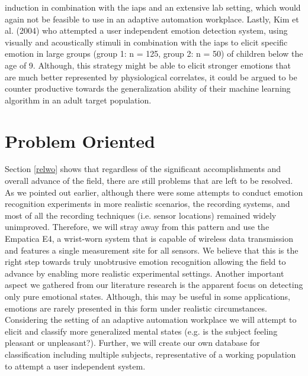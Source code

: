 induction in combination with the \gls{iaps} and an extensive lab setting, which would again not be feasible to use in an adaptive automation workplace. Lastly, Kim et al. (2004) who attempted a user independent emotion detection system, using visually and acoustically stimuli in combination with the \gls{iaps} to elicit specific emotion in large groups (group 1: n = 125, group 2: n = 50) of children below the age of 9. Although, this strategy might be able to elicit stronger emotions that are much better represented by physiological correlates, it could be argued to be counter productive towards the generalization ability of their machine learning algorithm in an adult target population. 

\section{Problem Oriented}
Section \ref{relwo} shows that regardless of the significant accomplishments and overall advance of the field, there are still problems that are left to be resolved. As we pointed out earlier, although there were some attempts to conduct emotion recognition experiments in more realistic scenarios, the recording systems, and most of all the recording techniques (i.e. sensor locations) remained widely unimproved. Therefore, we will stray away from this pattern and use the Empatica E4, a wrist-worn system that is capable of wireless data transmission and features a single measurement site for all sensors. We believe that this is the right step towards truly unobtrusive emotion recognition allowing the field to advance by enabling more realistic experimental settings.
Another important aspect we gathered from our literature research is the apparent focus on detecting only pure emotional states. Although, this may be useful in some applications, emotions are rarely presented in this form under realistic circumstances. Considering the setting of an adaptive automation workplace we will attempt to elicit and classify more generalized mental states (e.g. is the subject feeling pleasant or unpleasant?).
Further, we will create our own database for classification including multiple subjects, representative of a working population to attempt a user independent system.
